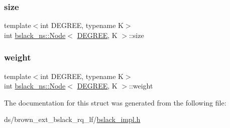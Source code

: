 \mbox{\label{structbslack__ns_1_1Node_a16b46adbea74fec74c130f68195bd51c}} 
\subsubsection{\texorpdfstring{size}{size}}
{\footnotesize\ttfamily template$<$int D\+E\+G\+R\+EE, typename K$>$ \\
int \hyperlink{structbslack__ns_1_1Node}{bslack\+\_\+ns\+::\+Node}$<$ \hyperlink{brown__sigouin__abtree__kcas_2adapter_8h_a5d88b17d70c985f2f2b8e987037fd6dd}{D\+E\+G\+R\+EE}, K $>$\+::size}

\mbox{\label{structbslack__ns_1_1Node_a7dd1e7f22c835fd6d45af633cf68685f}} 
\subsubsection{\texorpdfstring{weight}{weight}}
{\footnotesize\ttfamily template$<$int D\+E\+G\+R\+EE, typename K$>$ \\
int \hyperlink{structbslack__ns_1_1Node}{bslack\+\_\+ns\+::\+Node}$<$ \hyperlink{brown__sigouin__abtree__kcas_2adapter_8h_a5d88b17d70c985f2f2b8e987037fd6dd}{D\+E\+G\+R\+EE}, K $>$\+::weight}



The documentation for this struct was generated from the following file\+:\begin{DoxyCompactItemize}
\item 
ds/brown\+\_\+ext\+\_\+bslack\+\_\+rq\+\_\+lf/\hyperlink{bslack__impl_8h}{bslack\+\_\+impl.\+h}\end{DoxyCompactItemize}
